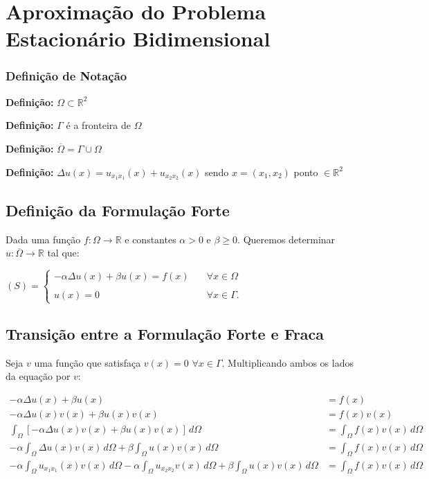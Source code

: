 
\chapter{Aproximação do Problema Estacionário Bidimensional}

\subsection*{Definição de Notação}

  \textbf{Definição:} $\Omega \subset \mathbb{R}^2$

  \textbf{Definição:} $\Gamma$ é a fronteira de $\Omega$

  \textbf{Definição:} $\overline{\Omega} = \Gamma \cup \Omega$

  \textbf{Definição:} $\Delta u(x) = u_{x_{1}x_{1}}(x) + u_{x_{2}x_{2}}(x)$ sendo $x = (x_1, x_2)$ ponto $\in \mathbb{R}^2$

\section{Definição da Formulação Forte}

  Dada uma função $f: \Omega \to \mathbb{R}$ e constantes $\alpha > 0$ e $\beta \geq 0$. Queremos determinar $u : \overline{\Omega} \to \mathbb{R}$ tal que:

  \begin{center}
    $(S) = \begin{cases}
      -\alpha \Delta u(x) + \beta u(x) = f(x) \quad &\forall x \in \Omega\\ \\
      u(x) = 0 \quad &\forall x \in \Gamma.
    \end{cases}$
  \end{center}

\section{Transição entre a Formulação Forte e Fraca}

  Seja $v$ uma função que satisfaça $v(x) = 0$ $\forall x \in \Gamma$. Multiplicando ambos os lados da equação por $v$:

  \begin{align*}
    -\alpha \Delta u(x) + \beta u(x) &= f(x) \\
    -\alpha \Delta u(x)v(x) + \beta u(x)v(x) &= f(x)v(x) \\
    \int_{\Omega} \left[-\alpha \Delta u(x)v(x) + \beta u(x)v(x)\right] \, d\Omega &= \int_{\Omega} f(x)v(x) \, d\Omega \\
    -\alpha \int_{\Omega} \Delta u(x)v(x) \, d\Omega + \beta \int_{\Omega} u(x)v(x) \, d\Omega &= \int_{\Omega} f(x)v(x) \, d\Omega \\
    -\alpha \int_{\Omega} u_{x_{1}x_{1}}(x)v(x) \, d\Omega -\alpha \int_{\Omega} u_{x_{2}x_{2}}v(x) \, d\Omega + \beta \int_{\Omega} u(x)v(x) \, d\Omega &= \int_{\Omega} f(x)v(x) \, d\Omega \\
  \end{align*}

